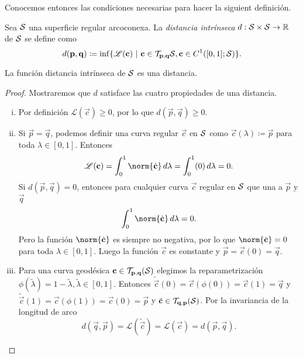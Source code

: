 Conocemos entonces las condiciones necesarias para hacer la siguient definición.
\begin{definition}
	Sea $\mathcal S$ una superficie regular arcoconexa. La \emph{distancia intrínseca} $d: \mathcal S \times \mathcal S \to \mathbb R$ de $\mathcal S$ se define como
	\begin{equation}
		d(\mathbf p, \mathbf q) \coloneqq \inf  \{\mathscr L(\mathbf c) \ \vert \ \mathbf c \in \mathcal T_{\mathbf p, \mathbf q}\mathcal S, \mathbf c \in C^1([0, 1]; \mathcal S) \}.
	\end{equation}
\end{definition}
\begin{proposition}
	La función distancia intrínseca de $\mathcal S$ es una distancia.
\end{proposition}
\begin{proof}
Mostraremos que $d$ satisface las cuatro propiedades de una distancia.
	\begin{enumerate}[(i)]
		\item Por definición $\mathscr L(\vec c) \ge 0$, por lo que $d(\vec p, \vec q) \ge 0$.
		\item Si $\vec p = \vec q$, podemos definir una curva regular $\vec c$ en $\mathcal S$ como $\vec c(\lambda) \coloneqq \vec p$ para toda $\lambda \in [0,1]$. Entonces
		\begin{equation}
			\mathscr L(\vec c) = \int_0^1 \norm{\dot{ \vec c}} \, d\lambda = \int_0^1 (0) \, d\lambda = 0.
		\end{equation}
		Si $d(\vec p, \vec q) = 0$, entonces para cualquier curva $\vec c$ regular en $\mathcal S$ que una a $\vec p$ y $\vec q$
		\begin{equation}
			 \int_0^1 \norm{\dot{ \vec c}} \, d\lambda  = 0.
		\end{equation}
		Pero la función $\norm{\dot{\vec c}}$ es siempre no negativa, por lo que $\norm{\dot{\vec c}} = 0$ para toda $\lambda \in [0,1]$. Luego la función $\vec c$ es constante y $\vec p = \vec c(0) = \vec q$.
		
		\item Para una curva geodésica $\mathbf c \in \mathcal T_{\mathbf p, \mathbf q}(\mathcal S)$ elegimos la reparametrización $\phi(\tilde \lambda) = 1 - \tilde \lambda, \tilde \lambda \in [0,1]$. Entonces $\tilde{\vec c}(0) = \vec c(\phi(0)) = \vec c(1) = \vec q$ y $\tilde{\vec c}(1) = \vec c(\phi(1)) = \vec c(0) = \vec p$ y $\tilde{\mathbf c} \in   \mathcal T_{\mathbf q, \mathbf p}(\mathcal S)$. Por la invariancia de la longitud de arco
		\begin{equation}
			d(\vec q, \vec p) = \mathscr L(\tilde{\vec c}) = \mathscr L(\vec c) = d(\vec p, \vec q).
		\end{equation}
		

\end{enumerate}
\end{proof}
